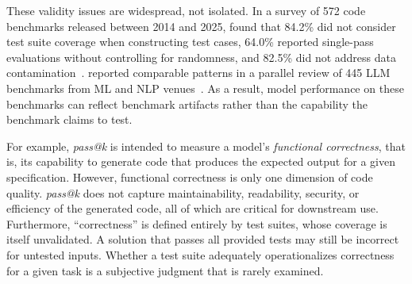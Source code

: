 \documentclass[smallextended]{svjour3}
\begin{document}
These validity issues are widespread, not isolated. In a survey of 572 code benchmarks released between 2014 and 2025, \citeauthor{cao2025should} found that 84.2\% did not consider test suite coverage when constructing test cases, 64.0\% reported single-pass evaluations without controlling for randomness, and 82.5\% did not address data contamination~\cite{cao2025should}. \citeauthor{bean2025measuring} reported comparable patterns in a parallel review of 445 LLM benchmarks from ML and NLP venues~\cite{bean2025measuring}. As a result, model performance on these benchmarks can reflect benchmark artifacts rather than the capability the benchmark claims to test.

For example, \emph{pass@k} is intended to measure a model's \textit{functional correctness}, that is, its capability to generate code that produces the expected output for a given specification. However, functional correctness is only one dimension of code quality. \emph{pass@k} does not capture maintainability, readability, security, or efficiency of the generated code, all of which are critical for downstream use. Furthermore, ``correctness'' is defined entirely by test suites, whose coverage is itself unvalidated. A solution that passes all provided tests may still be incorrect for untested inputs. Whether a test suite adequately operationalizes correctness for a given task is a subjective judgment that is rarely examined.
\end{document}
